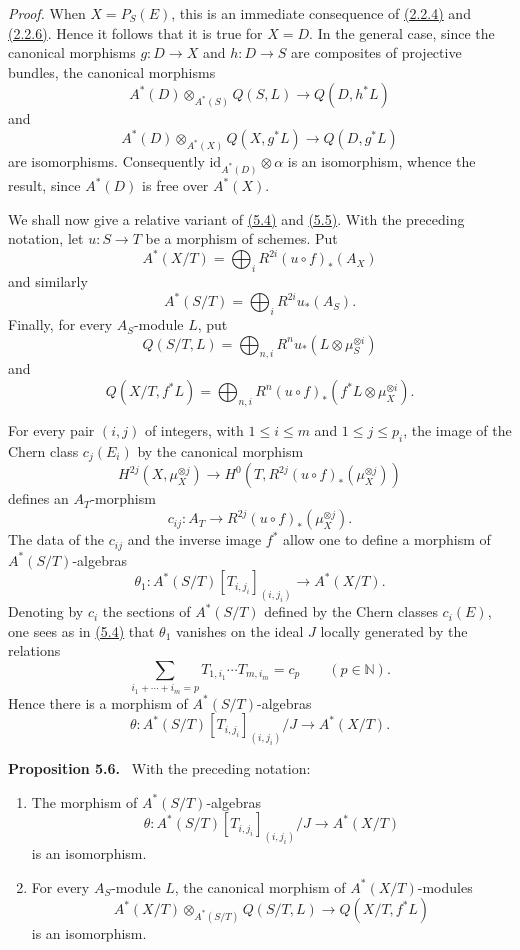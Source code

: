 \documentclass[11pt]{article}
\newenvironment{statement}[1]{\par\medskip\noindent\textbf{#1.}\ }{\par\medskip}
\begin{document}
\emph{Proof.} When $X=P_S(E)$, this is an immediate consequence of \hyperref[sga5:VII:corollary:2.2.4]{(2.2.4)} and \hyperref[sga5:VII:corollary:2.2.6]{(2.2.6)}. Hence it follows that it is true for $X=D$. In the general case, since the canonical morphisms $g:D\to X$ and $h:D\to S$ are composites of projective bundles, the canonical morphisms
\[
A^*(D)\otimes_{A^*(S)}Q(S,L)\to Q(D,h^*L)
\]
and
\[
A^*(D)\otimes_{A^*(X)}Q(X,g^*L)\to Q(D,g^*L)
\]
are isomorphisms. Consequently $\mathrm{id}_{A^*(D)}\otimes\alpha$ is an isomorphism, whence the result, since $A^*(D)$ is free over $A^*(X)$.

We shall now give a relative variant of \hyperref[sga5:VII:proposition:5.4]{(5.4)} and \hyperref[sga5:VII:proposition:5.5]{(5.5)}. With the preceding notation, let $u:S\to T$ be a morphism of schemes. Put
\[
A^*(X/T)=\bigoplus_i R^{2i}(u\circ f)_*(A_X)
\]
and similarly
\[
A^*(S/T)=\bigoplus_i R^{2i}u_*(A_S).
\]
Finally, for every $A_S$-module $L$, put
\[
Q(S/T,L)=\bigoplus_{n,i}R^n u_*(L\otimes\mu_S^{\otimes i})
\]
and
\[
Q(X/T,f^*L)=\bigoplus_{n,i}R^n(u\circ f)_*(f^*L\otimes\mu_X^{\otimes i}).
\]

For every pair $(i,j)$ of integers, with $1\le i\le m$ and $1\le j\le p_i$, the image of the Chern class $c_j(E_i)$ by the canonical morphism
\[
H^{2j}(X,\mu_X^{\otimes j})
\to H^0(T,R^{2j}(u\circ f)_*(\mu_X^{\otimes j}))
\]
defines an $A_T$-morphism
\[
c_{ij}:A_T\to R^{2j}(u\circ f)_*(\mu_X^{\otimes j}).
\]
The data of the $c_{ij}$ and the inverse image $f^*$ allow one to define a morphism of $A^*(S/T)$-algebras
\[
\theta_1:A^*(S/T)[T_{i,j_i}]_{(i,j_i)}\to A^*(X/T).
\]
Denoting by $c_i$ the sections of $A^*(S/T)$ defined by the Chern classes $c_i(E)$, one sees as in \hyperref[sga5:VII:proposition:5.4]{(5.4)} that $\theta_1$ vanishes on the ideal $J$ locally generated by the relations
\[
\sum_{i_1+\cdots+i_m=p}T_{1,i_1}\cdots T_{m,i_m}=c_p\qquad(p\in\mathbb N).
\]
Hence there is a morphism of $A^*(S/T)$-algebras
\[
\theta:A^*(S/T)[T_{i,j_i}]_{(i,j_i)}/J\to A^*(X/T).
\]

\label{sga5:VII:proposition:5.6}\begin{statement}{Proposition 5.6}
With the preceding notation:
\begin{enumerate}[label=\alph*)]
\item The morphism of $A^*(S/T)$-algebras
\[
\theta:A^*(S/T)[T_{i,j_i}]_{(i,j_i)}/J\to A^*(X/T)
\]
is an isomorphism.
\item For every $A_S$-module $L$, the canonical morphism of $A^*(X/T)$-modules
\[
A^*(X/T)\otimes_{A^*(S/T)}Q(S/T,L)\to Q(X/T,f^*L)
\]
is an isomorphism.
\end{enumerate}
\end{statement}
\end{document}
